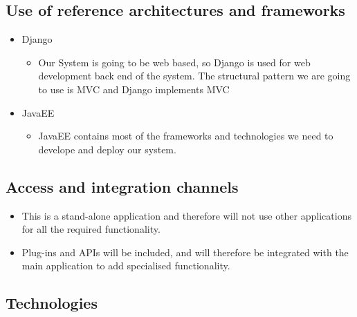 \documentclass[a4paper,12pt]{article}
\begin{document}

\subsection{Use of reference architectures and frameworks}
\begin{itemize}
\item Django
	\begin{itemize}
		\item Our System is going to be web based, so Django is used for web development back end of the system. The structural pattern we are going to use is MVC and Django implements MVC
	\end{itemize}
\item JavaEE
	\begin{itemize}
		\item JavaEE contains most of the frameworks and technologies we need to develope and deploy our system.
	\end{itemize}
\end{itemize}

\subsection{Access and integration channels}
	\begin{itemize}
		\item This is a stand-alone application and therefore will not use other applications for all the required functionality.
		\item Plug-ins and APIs will be included, and will therefore be integrated with the main application to add specialised 				functionality. 
	\end{itemize}

\subsection{Technologies}
\end{document}
